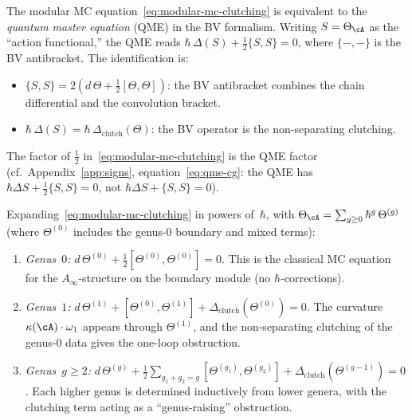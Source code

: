 \begin{remark}
\label{rem:qme-vs-mc}
The modular MC equation~\eqref{eq:modular-mc-clutching} is
equivalent to the \emph{quantum master equation} (QME) in the
BV formalism. Writing $S = \Theta_\cA$ as the ``action
functional,'' the QME reads
$\hbar\,\Delta(S) + \tfrac{1}{2}\{S, S\} = 0$, where
$\{-,-\}$ is the BV antibracket. The identification is:
\begin{itemize}
\item $\{S, S\} = 2(d\,\Theta + \tfrac{1}{2}[\Theta, \Theta])$:
 the BV antibracket combines the chain differential and the
 convolution bracket.
\item $\hbar\,\Delta(S) = \hbar\,\Delta_{\mathrm{clutch}}(\Theta)$:
 the BV operator is the non-separating clutching.
\end{itemize}
The factor of $\frac{1}{2}$ in~\eqref{eq:modular-mc-clutching}
is the QME factor (cf.\ Appendix~\ref{app:signs}, equation~\eqref{eq:qme-cg}: the QME
has $\hbar\Delta S + \frac{1}{2}\{S, S\} = 0$,
not $\hbar\Delta S + \{S, S\} = 0$).
\end{remark}

\begin{remark}
\label{rem:genus-expansion-mc}
Expanding~\eqref{eq:modular-mc-clutching} in powers
of~$\hbar$, with $\Theta_\cA = \sum_{g \geq 0}
\hbar^g\, \Theta^{(g)}$ (where $\Theta^{(0)}$ includes the
genus-$0$ boundary and mixed terms):
\begin{enumerate}[label=\textup{(\arabic*)}]
\item \emph{Genus~$0$:}
 $d\,\Theta^{(0)} + \tfrac{1}{2}[\Theta^{(0)}, \Theta^{(0)}]
 = 0$.
 This is the classical MC equation for the $A_\infty$-structure
 on the boundary module (no $\hbar$-corrections).
\item \emph{Genus~$1$:}
 $d\,\Theta^{(1)} + [\Theta^{(0)}, \Theta^{(1)}]
 + \Delta_{\mathrm{clutch}}(\Theta^{(0)}) = 0$.
 The curvature $\kappa(\cA) \cdot \omega_1$ appears through
 $\Theta^{(1)}$, and the non-separating clutching of the
 genus-$0$ data gives the one-loop obstruction.
\item \emph{Genus~$g \geq 2$:}
 $d\,\Theta^{(g)} + \frac{1}{2}\sum_{g_1 + g_2 = g}
 [\Theta^{(g_1)}, \Theta^{(g_2)}]
 + \Delta_{\mathrm{clutch}}(\Theta^{(g-1)}) = 0$.
 Each higher genus is determined inductively from lower genera,
 with the clutching term acting as a ``genus-raising''
 obstruction.
\end{enumerate}
\end{remark}

